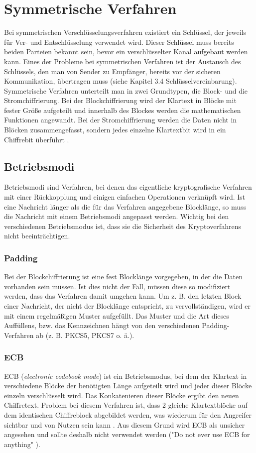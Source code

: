 \documentclass[10pt, a4paper,headsepline,pointednumbers]{scrreprt}
\begin{document}
\section{Symmetrische Verfahren}
Bei symmetrischen Verschlüsselungsverfahren existiert ein Schlüssel, der jeweils für Ver- und Entschlüsselung verwendet wird. Dieser Schlüssel muss bereits beiden Parteien bekannt sein, bevor ein verschlüsselter Kanal aufgebaut werden kann. Eines der Probleme bei symmetrischen Verfahren ist der Austausch des Schlüssels, den man von Sender zu Empfänger, bereits vor der sicheren Kommunikation, übertragen muss (siehe Kapitel 3.4  Schlüsselvereinbarung). Symmetrische Verfahren unterteilt man in zwei Grundtypen, die Block- und die Stromchiffrierung. Bei der Blockchiffrierung wird der Klartext in Blöcke mit fester Größe aufgeteilt und innerhalb des Blockes werden die mathematischen Funktionen angewandt. Bei der Stromchiffrierung werden die Daten nicht in Blöcken zusammengefasst, sondern jedes einzelne Klartextbit wird in ein Chiffrebit überführt \citep[S. 223]{book:angewandte-krypto}.

\subsection{Betriebsmodi}
Betriebsmodi sind Verfahren, bei denen das eigentliche kryptografische Verfahren mit einer Rückkopplung und einigen einfachen Operationen verknüpft wird. Ist eine Nachricht länger als die für das Verfahren angegebene Blocklänge, so muss die Nachricht mit einem Betriebsmodi angepasst werden. Wichtig bei den verschiedenen Betriebsmodus ist, dass sie die Sicherheit des Kryptoverfahrens nicht beeinträchtigen.

\subsubsection{Padding}
Bei der Blockchiffrierung ist eine fest Blocklänge vorgegeben, in der die Daten vorhanden sein müssen. Ist dies nicht der Fall, müssen diese so modifiziert werden, dass das Verfahren damit umgehen kann.
Um z. B. den letzten Block einer Nachricht, der nicht der Blocklänge entspricht, zu vervollständigen, wird er mit einem regelmäßigen Muster aufgefüllt. Das Muster und die Art dieses Auffüllens, bzw. das Kennzeichnen hängt von den verschiedenen Padding-Verfahren ab (z. B. PKCS5, PKCS7 o. ä.).

\subsubsection{ECB}
ECB (\textit{electronic codebook mode}) ist ein Betriebsmodus, bei dem der Klartext in verschiedene Blöcke der benötigten Länge aufgeteilt wird und jeder dieser Blöcke einzeln verschlüsselt wird. Das Konkatenieren dieser Blöcke ergibt den neuen Chiffretext. Problem bei diesem Verfahren ist, dass 2 gleiche Klartextblöcke auf dem identischen Chiffreblock abgebildet werden, was wiederum für den Angreifer sichtbar und von Nutzen sein kann \citep[S. 223ff]{book:angewandte-krypto}. Aus diesem Grund wird ECB als unsicher angesehen und sollte deshalb nicht verwendet werden ("Do not ever use ECB for anything" \citep[S. 69]{book:practical-crypto}).
\end{document}
